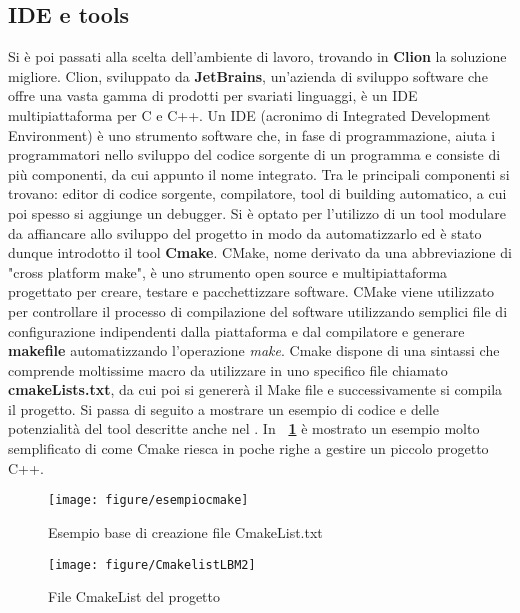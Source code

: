 {\subsection{IDE e tools}
Si \`e poi passati alla scelta dell'ambiente di lavoro, trovando in \textbf{Clion} la soluzione migliore. Clion, sviluppato da \textbf{JetBrains}\textregistered, un'azienda di sviluppo software che offre una vasta gamma di prodotti per svariati linguaggi, \`e un IDE multipiattaforma per C e C++. Un IDE (acronimo di Integrated Development Environment) \`e uno strumento software che, in fase di programmazione, aiuta i programmatori nello sviluppo del codice sorgente di un programma e consiste di pi\`u componenti, da cui appunto il nome integrato. Tra le principali componenti si trovano: editor di codice sorgente, compilatore, tool di building automatico, a cui poi spesso si aggiunge un debugger.
Si \`e optato per l'utilizzo di un tool modulare da affiancare allo sviluppo del progetto in modo da automatizzarlo ed \`e stato dunque introdotto il tool \textbf{Cmake}. CMake, nome derivato da una abbreviazione di "cross platform make", \`e uno strumento open source e multipiattaforma progettato per creare, testare e pacchettizzare software. CMake viene utilizzato per controllare il processo di compilazione del software utilizzando semplici file di configurazione indipendenti dalla piattaforma e dal compilatore e generare \textbf{makefile} automatizzando l'operazione \textit{make}. Cmake dispone di una sintassi che comprende moltissime macro da utilizzare in uno specifico file chiamato \textbf{cmakeLists.txt}, da cui poi si generer\`a il Make file e successivamente si compila il progetto.
Si passa di seguito a mostrare un esempio di codice e delle potenzialit\`a del tool descritte anche nel \cite{CMAKE:03}. In \textbf{\figurename~\ref{fig:EsempioCmakeList}} \`e mostrato un esempio molto semplificato di come Cmake riesca in poche righe a gestire un piccolo progetto C++.
\begin{figure}[!htb]
\begin{center}
	\texttt{[image: figure/esempiocmake]}
\end{center}
	\caption{Esempio base di creazione file CmakeList.txt \label{fig:EsempioCmakeList}}
\end{figure}

\begin{figure}[!htb]
	\begin{center}
		\texttt{[image: figure/CmakelistLBM2]}
	\end{center}
	\caption{File CmakeList del progetto \label{fig:CmakeListLBM}}
\end{figure}

}
